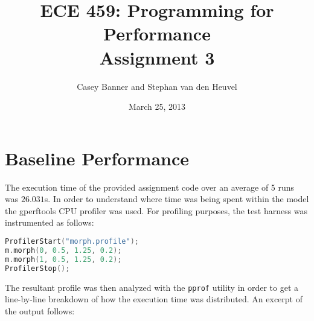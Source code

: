\documentclass[12pt]{article}
\title{ECE 459: Programming for Performance\\Assignment 3}
\author{Casey Banner and Stephan van den Heuvel}
\date{March 25, 2013}
\begin{document}
\maketitle

\section*{Baseline Performance}



The execution time of the provided assignment code over an average of
5 runs was $26.031$s. In order to understand where time was being spent
within the model the gperftools CPU profiler was used. For profiling
purposes, the test harness was instrumented as follows:

\begin{lstlisting}[language=C]
ProfilerStart("morph.profile");
m.morph(0, 0.5, 1.25, 0.2);
m.morph(1, 0.5, 1.25, 0.2);
ProfilerStop();
\end{lstlisting}

The resultant profile was then analyzed with the \texttt{pprof}
utility in order to get a line-by-line breakdown of how the execution
time was distributed. An excerpt of the output follows:
\end{document}

